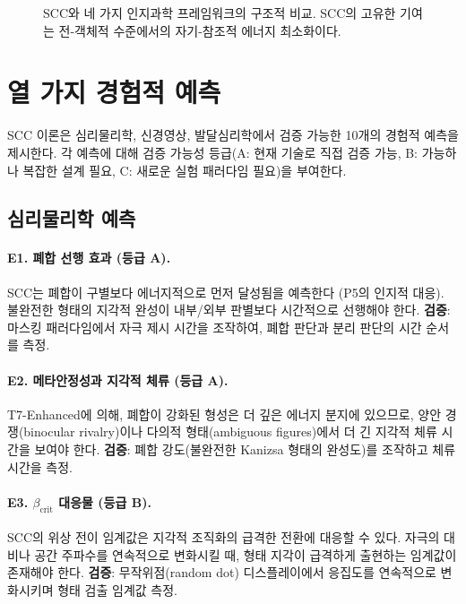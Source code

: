 \begin{figure}[t]
\centering
{}
\caption{SCC와 네 가지 인지과학 프레임워크의 구조적 비교. SCC의 고유한 기여는 전-객체적 수준에서의 자기-참조적 에너지 최소화이다.}
\label{fig:framework-comparison}
\end{figure}


\section{열 가지 경험적 예측}
\label{sec:ten-predictions}

SCC 이론은 심리물리학, 신경영상, 발달심리학에서 검증 가능한 10개의 경험적 예측을 제시한다. 각 예측에 대해 검증 가능성 등급(A: 현재 기술로 직접 검증 가능, B: 가능하나 복잡한 설계 필요, C: 새로운 실험 패러다임 필요)을 부여한다.

\subsection{심리물리학 예측}

\paragraph{E1. 폐합 선행 효과 (등급 A).}
SCC는 폐합이 구별보다 에너지적으로 먼저 달성됨을 예측한다 (P5의 인지적 대응). 불완전한 형태의 지각적 완성이 내부/외부 판별보다 시간적으로 선행해야 한다. \textbf{검증}: 마스킹 패러다임에서 자극 제시 시간을 조작하여, 폐합 판단과 분리 판단의 시간 순서를 측정.

\paragraph{E2. 메타안정성과 지각적 체류 (등급 A).}
T7-Enhanced에 의해, 폐합이 강화된 형성은 더 깊은 에너지 분지에 있으므로, 양안 경쟁(binocular rivalry)이나 다의적 형태(ambiguous figures)에서 더 긴 지각적 체류 시간을 보여야 한다. \textbf{검증}: 폐합 강도(불완전한 Kanizsa 형태의 완성도)를 조작하고 체류 시간을 측정.

\paragraph{E3. $\beta_{\mathrm{crit}}$ 대응물 (등급 B).}
SCC의 위상 전이 임계값은 지각적 조직화의 급격한 전환에 대응할 수 있다. 자극의 대비나 공간 주파수를 연속적으로 변화시킬 때, 형태 지각이 급격하게 출현하는 임계값이 존재해야 한다. \textbf{검증}: 무작위점(random dot) 디스플레이에서 응집도를 연속적으로 변화시키며 형태 검출 임계값 측정.

